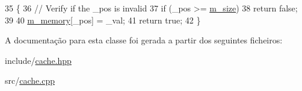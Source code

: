 \begin{DoxyCode}
35                                                   \{
36     \textcolor{comment}{// Verify if the \_pos is invalid}
37     \textcolor{keywordflow}{if} (\_pos >= \hyperlink{classCache_ace474de8dce358993886b1aa6c141c94}{m\_size})
38         \textcolor{keywordflow}{return} \textcolor{keyword}{false};
39 
40     \hyperlink{classCache_abe6f69287b3b70e7c5fd908873a90739}{m\_memory}[\_pos] = \_val;
41     \textcolor{keywordflow}{return} \textcolor{keyword}{true};
42 \}
\end{DoxyCode}


A documentação para esta classe foi gerada a partir dos seguintes ficheiros\+:\begin{DoxyCompactItemize}
\item 
include/\hyperlink{cache_8hpp}{cache.\+hpp}\item 
src/\hyperlink{cache_8cpp}{cache.\+cpp}\end{DoxyCompactItemize}
